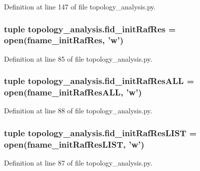 Definition at line 147 of file topology\-\_\-analysis.\-py.

\hypertarget{a00128_aa47d62b7ce95f5c4e730d081209770c2}{
\subsubsection[{fid\-\_\-init\-Raf\-Res}]{\setlength{\rightskip}{0pt plus 5cm}tuple topology\-\_\-analysis.\-fid\-\_\-init\-Raf\-Res = open({\bf fname\-\_\-init\-Raf\-Res}, 'w')}}\label{a00128_aa47d62b7ce95f5c4e730d081209770c2}


Definition at line 85 of file topology\-\_\-analysis.\-py.

\hypertarget{a00128_afcacf140d9efed55635e8dcd084db870}{
\subsubsection[{fid\-\_\-init\-Raf\-Res\-A\-L\-L}]{\setlength{\rightskip}{0pt plus 5cm}tuple topology\-\_\-analysis.\-fid\-\_\-init\-Raf\-Res\-A\-L\-L = open({\bf fname\-\_\-init\-Raf\-Res\-A\-L\-L}, 'w')}}\label{a00128_afcacf140d9efed55635e8dcd084db870}


Definition at line 88 of file topology\-\_\-analysis.\-py.

\hypertarget{a00128_abca13a03834449d5629252329999f1a3}{
\subsubsection[{fid\-\_\-init\-Raf\-Res\-L\-I\-S\-T}]{\setlength{\rightskip}{0pt plus 5cm}tuple topology\-\_\-analysis.\-fid\-\_\-init\-Raf\-Res\-L\-I\-S\-T = open({\bf fname\-\_\-init\-Raf\-Res\-L\-I\-S\-T}, 'w')}}\label{a00128_abca13a03834449d5629252329999f1a3}


Definition at line 87 of file topology\-\_\-analysis.\-py.

